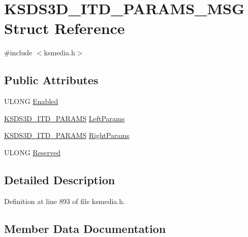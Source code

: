\hypertarget{struct_k_s_d_s3_d___i_t_d___p_a_r_a_m_s___m_s_g}{}\section{K\+S\+D\+S3\+D\+\_\+\+I\+T\+D\+\_\+\+P\+A\+R\+A\+M\+S\+\_\+\+M\+SG Struct Reference}
\label{struct_k_s_d_s3_d___i_t_d___p_a_r_a_m_s___m_s_g}


{\ttfamily \#include $<$ksmedia.\+h$>$}

\subsection*{Public Attributes}
\begin{DoxyCompactItemize}
\item 
U\+L\+O\+NG \hyperlink{struct_k_s_d_s3_d___i_t_d___p_a_r_a_m_s___m_s_g_ac5eee51a281344a0cd587533db391d86}{Enabled}
\item 
\hyperlink{struct_k_s_d_s3_d___i_t_d___p_a_r_a_m_s}{K\+S\+D\+S3\+D\+\_\+\+I\+T\+D\+\_\+\+P\+A\+R\+A\+MS} \hyperlink{struct_k_s_d_s3_d___i_t_d___p_a_r_a_m_s___m_s_g_a15ce8440179c74c0277ed22b99aedb3a}{Left\+Params}
\item 
\hyperlink{struct_k_s_d_s3_d___i_t_d___p_a_r_a_m_s}{K\+S\+D\+S3\+D\+\_\+\+I\+T\+D\+\_\+\+P\+A\+R\+A\+MS} \hyperlink{struct_k_s_d_s3_d___i_t_d___p_a_r_a_m_s___m_s_g_a7f7d218baf99ce8e6eb04e76cad9b85d}{Right\+Params}
\item 
U\+L\+O\+NG \hyperlink{struct_k_s_d_s3_d___i_t_d___p_a_r_a_m_s___m_s_g_a068b4739e6282c24630bc5580d634495}{Reserved}
\end{DoxyCompactItemize}


\subsection{Detailed Description}


Definition at line 893 of file ksmedia.\+h.



\subsection{Member Data Documentation}
